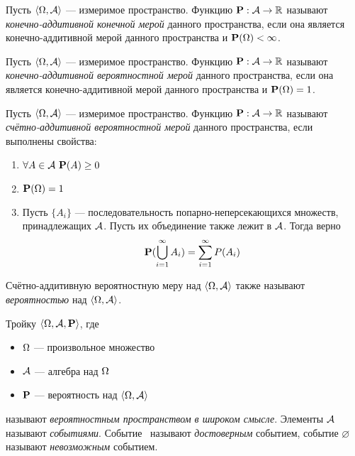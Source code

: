 \begin{definition}
	Пусть $\langle \Omega, \mathcal{A} \rangle$ --- измеримое пространство. Функцию $\mathbf{P} : \mathcal{A} \rightarrow \mathbb{R}$ называют {\it конечно-аддитивной конечной мерой} данного пространства, если она является конечно-аддитивной мерой данного пространства и $\mathbf{P} (\Omega) < \infty$.
\end{definition}

\begin{definition}
	Пусть $\langle \Omega, \mathcal{A} \rangle$ --- измеримое пространство. Функцию $\mathbf{P} : \mathcal{A} \rightarrow \mathbb{R}$ называют {\it конечно-аддитивной вероятностной мерой} данного пространства, если она является конечно-аддитивной мерой данного пространства и $\mathbf{P} (\Omega) = 1$.
\end{definition}

\begin{definition}
	Пусть $\langle \Omega, \mathcal{A} \rangle$ --- измеримое пространство. Функцию $\mathbf{P} : \mathcal{A} \rightarrow \mathbb{R}$ называют {\it счётно-аддитивной вероятностной мерой} данного пространства, если выполнены свойства:
	\begin{enumerate}
		\item $\forall A \in \mathcal{A} \ \mathbf{P}(A) \ge 0$
		\item $\mathbf{P} (\Omega) = 1$
		\item Пусть $\{A_i\}$ --- последовательность попарно-неперсекающихся множеств, принадлежащих $\mathcal{A}$. Пусть их объединение также лежит в $\mathcal{A}$. Тогда верно
		$$\mathbf{P} (\bigcup_{i=1}^{\infty}A_i) = \sum_{i=1}^{\infty}P(A_i)$$
	\end{enumerate}
Счётно-аддитивную вероятностную меру над $\langle \Omega, \mathcal{A} \rangle$ также называют {\it вероятностью} над $\langle \Omega, \mathcal{A} \rangle$.
\end{definition}

\begin{definition}
	Тройку $\langle \Omega, \mathcal{A}, \mathbf{P} \rangle$, где
	\begin{itemize}
		\item $\Omega$ --- произвольное множество
		\item $\mathcal{A}$ --- алгебра над $\Omega$
		\item $\mathbf{P}$ --- вероятность над $\langle \Omega, \mathcal{A} \rangle$
	\end{itemize}
	называют {\it вероятностным пространством в широком смысле}. Элементы $\mathcal{A}$ называют {\it событиями}. Событие \oO~называют {\it достоверным} событием, событие $\varnothing$ называют {\it невозможным} событием.
\end{definition}

